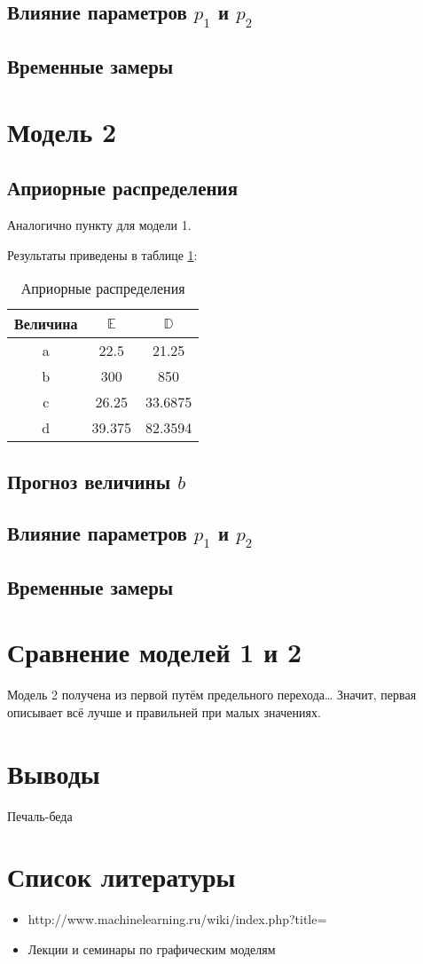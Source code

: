 \documentclass[12pt,a4paper,oneside,fleqn,leqno]{article}
\begin{document}
		\subsection{Влияние параметров $p_1$ и $p_2$}
		\subsection{Временные замеры}
	\section{Модель 2}
		\subsection{Априорные распределения}
			Аналогично пункту для модели 1.\par
			Результаты приведены в таблице \ref{tab:aprior2}:
			\begin{table}[H]
			\centering
			\begin{tabular}{|c|c|c|}
				\hline
				Величина & $\mathbb{E}$ & $\mathbb{D}$\\
				\hline
				a & 22.5 & 21.25\\
				\hline
				b & 300 & 850\\
				\hline
				c & 26.25 & 33.6875\\
				\hline
				d & 39.375 & 82.3594\\
				\hline
				\end{tabular}
			\caption{Априорные распределения}
			\label{tab:aprior2}
		\end{table}
		\subsection{Прогноз величины $b$}
		\subsection{Влияние параметров $p_1$ и $p_2$}
		\subsection{Временные замеры}
	\section{Сравнение моделей 1 и 2}
		Модель 2 получена из первой путём предельного перехода… Значит, первая описывает всё лучше и правильней при малых значениях.
	\section{Выводы}
		Печаль-беда
	\section{Список литературы}
		\begin{itemize}
			\item
			http://www.machinelearning.ru/wiki/index.php?title=
			\item
			Лекции и семинары по графическим моделям
		\end{itemize}
\end{document}
